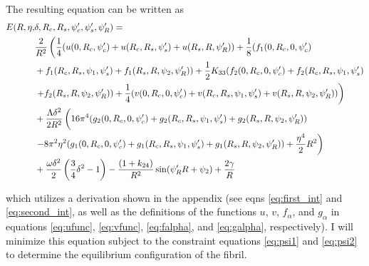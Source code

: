\documentclass[12pt]{article}
\begin{document}
The resulting equation can be written as
\begin{align}\label{eq:piecewise_E}
E(R,\eta,&\delta,R_c,R_s,\psi_c^{\prime},\psi_s^{\prime},\psi_R^{\prime})=\nonumber\\
&\frac{2}{R^2}\left(\frac{1}{4}(u(0,R_c,\psi_c^{\prime})+u(R_c,R_s,\psi_s^{\prime})+u(R_s,R,\psi_R^{\prime}))+\frac{1}{8}(f_1(0,R_c,0,\psi_c^{\prime})\right.\nonumber\\
&+f_1(R_c,R_s,\psi_1,\psi_s^{\prime})+f_1(R_s,R,\psi_2,\psi_R^{\prime}))+\frac{1}{2}K_{33}(f_2(0,R_c,0,\psi_c^{\prime})+f_2(R_c,R_s,\psi_1,\psi_s^{\prime})\nonumber\\
&\left.+f_2(R_s,R,\psi_2,\psi_R^{\prime}))+\frac{1}{4}(v(0,R_c,0,\psi_c^{\prime})+v(R_c,R_s,\psi_1,\psi_s^{\prime})+v(R_s,R,\psi_2,\psi_R^{\prime}))\right)\nonumber\\
&+\frac{\Lambda\delta^2}{2R^2}\left(\vphantom{\frac{1}{2}}16\pi^4(g_2(0,R_c,0,\psi_c^{\prime})+g_2(R_c,R_s,\psi_1,\psi_s^{\prime})+g_2(R_s,R,\psi_2,\psi_R^{\prime}))\right.\nonumber\\
&\left.-8\pi^2\eta^2(g_1(0,R_c,0,\psi_c^{\prime})+g_1(R_c,R_s,\psi_1,\psi_s^{\prime})+g_1(R_s,R,\psi_2,\psi_R^{\prime}))+\frac{\eta^4}{2}R^2\right)\nonumber\\
&+\frac{\omega\delta^2}{2}\left(\frac{3}{4}\delta^2-1\right)-\frac{(1+k_{24})}{R^2}\sin(\psi_R^{\prime}R+\psi_2)+\frac{2\gamma}{R}
\end{align}

which utilizes a derivation shown in the appendix (see eqns \ref{eq:first_int} and \ref{eq:second_int}, as well as the definitions of the functions $u$, $v$, $f_{\alpha}$, and $g_{\alpha}$ in equations \ref{eq:ufunc}, \ref{eq:vfunc}, \ref{eq:falpha}, and \ref{eq:galpha}, respectively). I will minimize this equation subject to the constraint equations \ref{eq:psi1} and \ref{eq:psi2} to determine the equilibrium configuration of the fibril.
\end{document}
